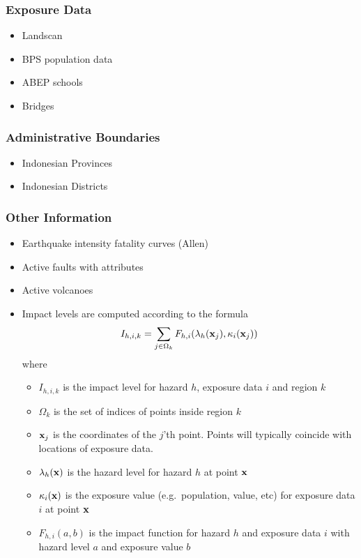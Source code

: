 \documentclass[a4paper]{article}
\begin{document}
\subsubsection*{Exposure Data}
\begin{itemize}  
  \item Landscan
  \item BPS population data
  \item ABEP schools
  \item Bridges
\end{itemize} 

\subsubsection*{Administrative Boundaries}
\begin{itemize}  
   \item Indonesian Provinces
   \item Indonesian Districts
\end{itemize} 
   
\subsubsection*{Other Information}
\begin{itemize} 
  \item Earthquake intensity fatality curves (Allen)
  \item Active faults with attributes
  \item Active volcanoes
  \item Impact levels are computed according to the formula
  \[
     I_{h,i,k} = \sum_{j \in \Omega_k} F_{h,i}(\lambda_h(\bold{x}_j), \kappa_i(\bold{x}_j))
  \] where
  \begin{itemize} 
    \item $I_{h,i,k}$ is the impact level for hazard $h$, exposure data $i$ and region $k$
    \item $\Omega_k$ is the set of indices of points inside region $k$
    \item $\bold{x}_j$ is the coordinates of the $j$'th point. Points will typically coincide with locations of exposure data.
    \item $\lambda_h(\bold{x})$ is the hazard level for hazard $h$ at point $\bold{x}$
    \item $\kappa_i(\bold{x})$ is the exposure value (e.g.\ population,  value, etc) for exposure data $i$ at point $\bold{x}$
    \item $F_{h,i}(a, b)$ is the impact function for hazard $h$ and exposure data $i$ with hazard level $a$ and exposure value $b$
  \end{itemize} 
\end{itemize} 
\end{document}
